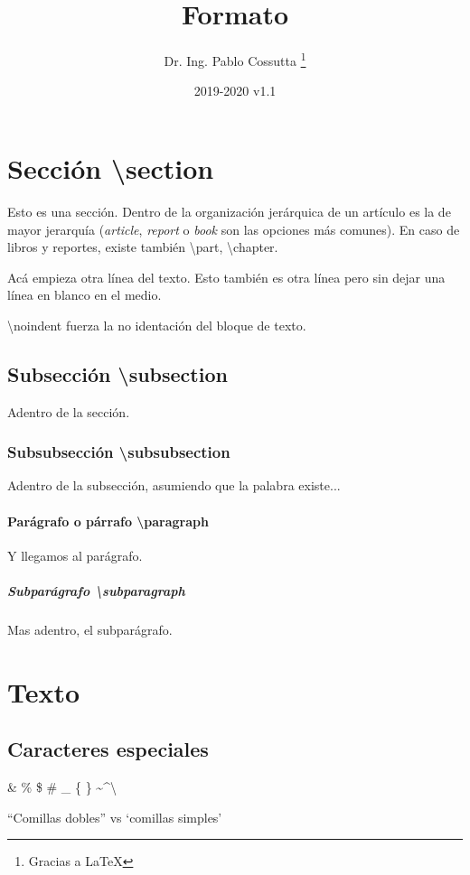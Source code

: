 \documentclass[11pt, a4paper]{article}
\title{Formato}
\author{Dr. Ing. Pablo Cossutta \thanks{Gracias a \LaTeX}}
\date{2019-2020 v1.1}
\begin{document}
\maketitle
\section{Sección \textbackslash section} \label{sec1}
Esto es una sección. Dentro de la organización jerárquica de un artículo es la de mayor jerarquía (\textit{article}, \textit{report} o \textit{book} son las opciones más comunes). En caso de libros y reportes, existe también \textbackslash part, \textbackslash chapter.

Acá empieza otra línea del texto.
Esto también es otra línea pero sin dejar una línea en blanco en el medio. 

\noindent \textbackslash noindent fuerza la no identación del bloque de texto.

\subsection{Subsección \textbackslash subsection}
Adentro de la sección. 

\subsubsection{Subsubsección \textbackslash subsubsection}
Adentro de la subsección, asumiendo que la palabra existe...

\paragraph{Parágrafo  o párrafo \textbackslash paragraph}
Y llegamos al parágrafo.
\subparagraph{Subparágrafo \textbackslash subparagraph}
Mas adentro, el subparágrafo.

\section{Texto}
\subsection{Caracteres especiales}
\& \% \$ \# \_ \{ \} \textasciitilde \textasciicircum \textbackslash

``Comillas dobles'' vs `comillas simples'
\end{document}
